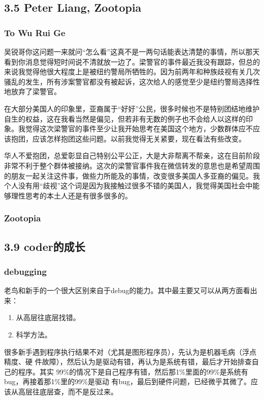 \documentclass[11pt]{article}
\begin{document}
\subsection*{3.5 Peter Liang, Zootopia}
\label{sec:orgheadline140}
\subsubsection*{To Wu Rui Ge}
\label{sec:orgheadline138}
吴锐哥你这问题一来就问“怎么看”这真不是一两句话能表达清楚的事情，所以那天看到你消息觉得短时间说不清就放一边了。梁警官的事件最近我没有跟踪，但总的来说我觉得他很大程度上是被纽约警局所牺牲的。因为前两年和种族歧视有关几次骚乱的发生，所有涉案警官都没有被起诉，这次给人的感觉至少是纽约警局选择性地放弃了梁警官。

在大部分美国人的印象里，亚裔属于“好好”公民，很多时候也不是特别团结地维护自生的权益，这在我看当然是偏见，但若非有无数的例子也不会给人以这样的印象。我觉得这次梁警官的事件至少让我开始思考在美国这个地方，少数群体应不应该抱团，应该怎样抱团这些问题。以前我觉得无关紧要，现在看法有些改变。

华人不爱抱团，总爱彰显自己特别公平公正，大是大非帮离不帮亲，这在目前阶段非常不利于整个群体被接纳。这次的梁警官事件我在微信转发的意思也是希望周围的朋友一起关注这件事，做些力所能及的事情，改变很多美国人多亚裔的偏见。我个人没有用“歧视”这个词是因为我接触过很多不错的美国人，我觉得美国社会中能够理性思考的本土人还是有很多很多的。
\subsubsection*{Zootopia}
\label{sec:orgheadline139}
\subsection*{3.9 coder的成长}
\label{sec:orgheadline143}
\subsubsection*{debugging}
\label{sec:orgheadline141}
老鸟和新手的一个很大区别来自于debug的能力。其中最主要又可以从两方面看出来：
\begin{enumerate}
\item 从高层往底层找错。
\item 科学方法。
\end{enumerate}

很多新手遇到程序执行结果不对（尤其是图形程序员），先认为是机器毛病（浮点精度、硬
件故障），然后认为是驱动有错，再认为是系统有错，最后才开始排查自己的程序。其实
99\%的情况下是自己程序有错，然后那1\%里面的99\%是系统有bug，再接着那1\%里的99\%是驱动
有bug，最后到硬件问题，已经微乎其微了。应该从高层往底层查，而不是反过来。
\end{document}
